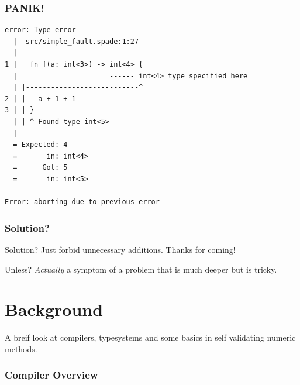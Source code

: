 \documentclass{beamer}
\begin{document}
\begin{frame}[containsverbatim]
\frametitle{PANIK!}
\begin{verbatim}
error: Type error
  |- src/simple_fault.spade:1:27
  |
1 |   fn f(a: int<3>) -> int<4> {
  |                      ------ int<4> type specified here
  | |---------------------------^
2 | |   a + 1 + 1
3 | | }
  | |-^ Found type int<5>
  |
  = Expected: 4
  =       in: int<4>
  =      Got: 5
  =       in: int<5>

Error: aborting due to previous error
\end{verbatim}
\end{frame}

\begin{frame}
\frametitle{Solution?}
\begin{block}{Solution?}
Just forbid unnecessary additions. Thanks for coming!
\end{block}
\pause
\begin{alertblock}{Unless?}
\textit{Actually} a symptom of a problem that is much deeper but is tricky.
\end{alertblock}
\end{frame}

\section{Background}

\begin{frame}[containsverbatim]
A breif look at compilers, typesystems and some basics in self validating numeric methods.
\end{frame}

\begin{frame}[containsverbatim]
\frametitle{Compiler Overview}
\begin{figure}[h!]
\begin{center}
\end{center}
\end{figure}
\end{frame}
\end{document}
